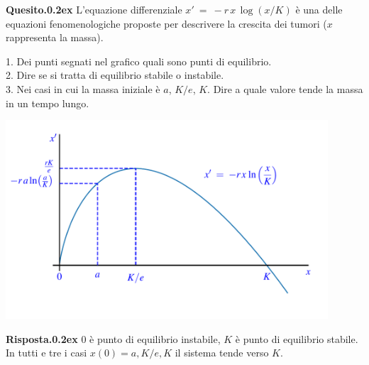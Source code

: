 \documentclass[12pt,twoside,a4paper]{article}
\newenvironment{question}{\par\bigskip\textbf{Quesito.\kern0.2ex}}{\vspace{\parskip}}
\newenvironment{answer}{\par\bigskip\textbf{Risposta.\kern0.2ex}}{}
\begin{document}
\begin{question}
L'equazione differenziale $\displaystyle x'\ =\ - r\,x\,\log\left(x/K\right)$ è una delle equazioni fenomenologiche proposte per descrivere la crescita dei tumori ($x$ rappresenta la massa).

1. Dei punti segnati nel grafico quali sono punti di equilibrio.\\
2. Dire se si tratta di equilibrio stabile o instabile.\\
3. Nei casi in cui la massa iniziale è $a$, $K/e$, $K$. Dire a quale valore tende la massa in un tempo lungo.

\hfil\includegraphics[width=0.9\textwidth]{logistica1.pdf}

\begin{answer}
$0$ è punto di equilibrio instabile, $K$ è punto di equilibrio stabile. In tutti e tre i casi $x(0)=a, K/e, K$ il sistema tende verso $K$.


\end{answer}
\end{question}
\end{document}

